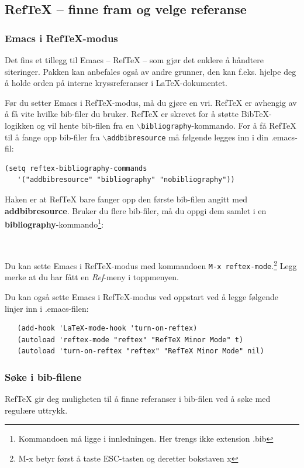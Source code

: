 \documentclass[11pt,norsk,a4paper]{article}
\newcommand{\kdo}[1]{\texttt{#1}}
\newcommand{\bt}{BibTeX{}}
\begin{document}
\subsection{RefTeX -- finne fram og velge referanse}
\subsubsection*{Emacs i RefTeX-modus}
Det fins et tillegg til Emacs -- RefTeX -- som gjør det enklere å
håndtere siteringer\cite{reftex}. Pakken kan anbefales også av andre
grunner, den kan f.eks. hjelpe deg å holde orden på interne
kryssreferanser i \LaTeX-dokumentet.

Før du setter Emacs i RefTeX-modus, må du gjøre en vri. RefTeX er
avhengig av å få vite hvilke bib-filer du bruker. RefTeX er skrevet
for å støtte \bt-logikken og vil hente bib-filen fra en
\kdo{$\backslash$bibliography}-kommando. For å få RefTeX til å fange
opp bib-filer fra \kdo{$\backslash$addbibresource} må følgende legges
inn i din .emacs-fil:

{\footnotesize\begin{verbatim}
(setq reftex-bibliography-commands 
   '("addbibresource" "bibliography" "nobibliography")) 
\end{verbatim}}
Haken er at RefTeX bare fanger opp den første bib-filen angitt med
\textbf{addbibresource}. Bruker du flere bib-filer, må du oppgi dem
samlet i en \textbf{bibliography}-kommando\footnote{Kommandoen må
  ligge i innledningen. Her trengs ikke
  extension .bib}:

{\footnotesize\begin{verbatim}
      
\end{verbatim}}

Du kan sette Emacs i RefTeX-modus med kommandoen {\footnotesize \verb=M-x reftex-mode=}.\footnote{M-x betyr først å taste ESC-tasten og deretter bokstaven x} 
Legg merke at du har fått en \textit{Ref}-meny i
toppmenyen.

Du kan også sette Emacs i RefTeX-modus ved oppstart ved å legge følgende
linjer inn i .emacs-filen:

{\footnotesize\begin{verbatim}
   (add-hook 'LaTeX-mode-hook 'turn-on-reftex)
   (autoload 'reftex-mode "reftex" "RefTeX Minor Mode" t)
   (autoload 'turn-on-reftex "reftex" "RefTeX Minor Mode" nil)
\end{verbatim}}

\subsubsection*{Søke i bib-filene}
RefTeX gir deg muligheten til å finne referanser i bib-filen ved å
søke med regulære uttrykk.
\end{document}
